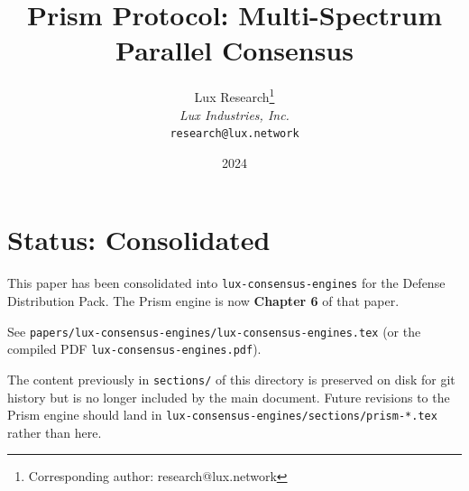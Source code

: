 \documentclass[11pt,a4paper]{article}
\title{\textbf{Prism Protocol: Multi-Spectrum Parallel Consensus}}
\author{
Lux Research\thanks{Corresponding author: research@lux.network}\\
\textit{Lux Industries, Inc.}\\
\texttt{research@lux.network}
}
\date{2024}
\begin{document}
\luxcoverpage

\section*{Status: Consolidated}

This paper has been consolidated into \texttt{lux-consensus-engines} for the
Defense Distribution Pack. The Prism engine is now \textbf{Chapter 6} of that paper.

See \texttt{papers/lux-consensus-engines/lux-consensus-engines.tex} (or the
compiled PDF \texttt{lux-consensus-engines.pdf}).

The content previously in \texttt{sections/} of this directory is preserved on
disk for git history but is no longer included by the main document. Future
revisions to the Prism engine should land in
\texttt{lux-consensus-engines/sections/prism-*.tex} rather than here.
\end{document}
